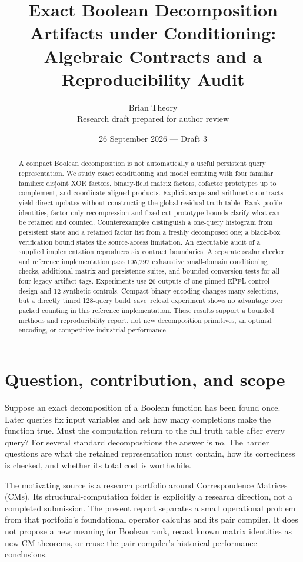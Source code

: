 \documentclass[11pt]{article}
\title{Exact Boolean Decomposition Artifacts under Conditioning:\\Algebraic Contracts and a Reproducibility Audit}
\author{Brian Theory\\\small Research draft prepared for author review}
\date{26 September 2026 --- Draft 3}
\theoremstyle{definition}\newtheorem{definition}[theorem]{Definition}
\theoremstyle{remark}\newtheorem{remark}[theorem]{Remark}
\begin{document}
\maketitle
\begin{abstract}
A compact Boolean decomposition is not automatically a useful persistent query representation. We study exact conditioning and model counting with four familiar families: disjoint XOR factors, binary-field matrix factors, cofactor prototypes up to complement, and coordinate-aligned products. Explicit scope and arithmetic contracts yield direct updates without constructing the global residual truth table. Rank-profile identities, factor-only recompression and fixed-cut prototype bounds clarify what can be retained and counted. Counterexamples distinguish a one-query histogram from persistent state and a retained factor list from a freshly decomposed one; a black-box verification bound states the source-access limitation. An executable audit of a supplied implementation reproduces six contract boundaries. A separate scalar checker and reference implementation pass 105,292 exhaustive small-domain conditioning checks, additional matrix and persistence suites, and bounded conversion tests for all four legacy artifact tags. Experiments use 26 outputs of one pinned EPFL control design and 12 synthetic controls. Compact binary encoding changes many selections, but a directly timed 128-query build--save--reload experiment shows no advantage over packed counting in this reference implementation. These results support a bounded methods and reproducibility report, not new decomposition primitives, an optimal encoding, or competitive industrial performance.
\end{abstract}

\section{Question, contribution, and scope}
\label{sec:scope}
Suppose an exact decomposition of a Boolean function has been found once. Later queries fix input variables and ask how many completions make the function true. Must the computation return to the full truth table after every query? For several standard decompositions the answer is no. The harder questions are what the retained representation must contain, how its correctness is checked, and whether its total cost is worthwhile.

The motivating source is a research portfolio around Correspondence Matrices (CMs)\cite{archive}. Its structural-computation folder is explicitly a research direction, not a completed submission. The present report separates a small operational problem from that portfolio's foundational operator calculus and its pair compiler. It does not propose a new meaning for Boolean rank, recast known matrix identities as new CM theorems, or reuse the pair compiler's historical performance conclusions.
\end{document}
